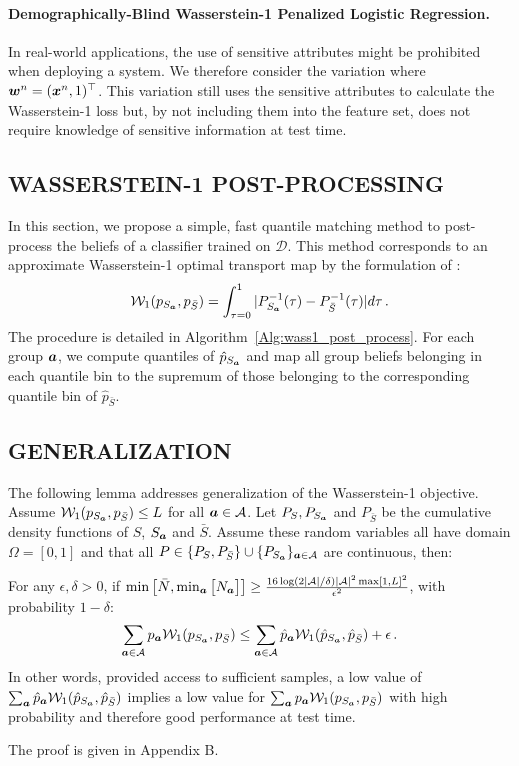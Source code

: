 \documentclass[letterpaper]{article}
\theoremstyle{definition}
\newcommand{\W}{\mathcal{W}}
\newcommand{\Sa}{S_{\va}}
\newcommand{\bS}{\bar{S}}
\begin{document}
\paragraph{Demographically-Blind Wasserstein-1 Penalized Logistic Regression.}
In real-world applications, the use of sensitive attributes might be prohibited when deploying a system. We therefore consider the variation where ${\bm{w}}^n = ({\bm{x}}^n, 1)^\top$. This variation still uses the sensitive attributes to calculate the Wasserstein-1 loss but, by not including them into the feature set, does not require knowledge of sensitive information at test time. 

\subsection{WASSERSTEIN-1 POST-PROCESSING\label{sec:wass1post}}
In this section, we propose a simple, fast quantile matching method to post-process the beliefs of a classifier trained on $\mathcal{D}$. This method corresponds to an approximate Wasserstein-1 optimal transport map by the formulation of \citet{rachev98mass}:
\[
\W_1(p_{\Sa}, p_{\bS}) = \int_{\tau=0}^1 |P_{\Sa}^{-1}(\tau) - P_{\bS}^{-1}(\tau)|d\tau\,.
\]
The procedure is detailed in Algorithm~\ref{Alg:wass1_post_process}.
For each group ${\bm{a}}$, we compute quantiles of $\hat p_{\Sa}$ and map all group beliefs belonging in each quantile bin to the supremum of those belonging to the corresponding quantile bin of $\hat p_{\bS}$.

\subsection{GENERALIZATION}
The following lemma addresses generalization of the Wasserstein-1 objective. Assume $\W_1(p_{S_\va}, p_{\bS}) \leq L$ for all ${\bm{a}}\in \mathcal{A}$. Let $P_S, P_{S_{\bm{a}}}$ and $P_{\bS}$ be the cumulative density functions of $S$, $S_{\bm{a}}$ and $\bS$. Assume these random variables all have domain $\Omega = [0,1]$ and that all $P \in \{  P_S, P_{\bS}\} \cup \{  P_{S_\va}\}_{\va \in \mathcal{A}}$ are continuous, then:
\begin{lemma}\label{lemma:wass_gen}
For any $\epsilon, \delta > 0$, if 
$\min\big[\bar{N}, \min_{{\bm{a}}}\big[N_{\bm{a}}\big]\big]\geq  \frac{16\log(2|\mathcal{A}|/\delta)|\mathcal{A}|^2\max[1, L]^2}{\epsilon^2}$, with probability $1-\delta$:
\begin{equation*}
    \sum_{\va \in \mathcal{A}} p_{\va} \W_1(p_{S_{\va}}, p_{\bS})  
    \leq \sum_{\va \in \mathcal{A}} \hat{p}_{\va} \W_1(\hat{p}_{S_\va},\hat{p}_{\bS}) + \epsilon\,.
\end{equation*}
In other words, provided access to sufficient samples, a low value of $\sum_{\va} \hat{p}_{\va} \W_1(\hat{p}_{S_\va}, \hat{p}_{\bS})$ implies a low value for $\sum_{\va} p_{\va} \W_1(p_{S_\va}, p_{\bS}) $ with high probability and therefore good performance at test time. 
\end{lemma}
The proof is given in Appendix B.
\end{document}
